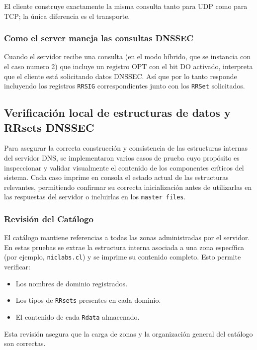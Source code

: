 El cliente construye exactamente la misma consulta tanto para UDP como para TCP; la única diferencia es el transporte.

\subsubsection{Como el server maneja las consultas DNSSEC}

Cuando el servidor recibe una consulta (en el modo híbrido, que se instancia con el caso numero 2) que incluye un registro OPT con el bit DO activado, interpreta que el cliente está solicitando datos DNSSEC.
Así que por lo tanto responde incluyendo los registros \texttt{RRSIG} correspondientes junto con los \texttt{RRSet} solicitados.


\subsection{Verificación local de estructuras de datos y RRsets DNSSEC}

Para asegurar la correcta construcción y consistencia de las estructuras internas del servidor DNS, se implementaron varios casos de prueba cuyo propósito es inspeccionar y validar visualmente el 
contenido de los componentes críticos del sistema. Cada caso imprime en consola el estado actual de las estructuras relevantes, permitiendo confirmar su correcta inicialización antes de utilizarlas en 
las respuestas del servidor o incluirlas en los \texttt{master files}.

\subsubsection{Revisión del Catálogo}

El catálogo mantiene referencias a todas las zonas administradas por el servidor.  
En estas pruebas se extrae la estructura interna asociada a una zona específica (por ejemplo, \texttt{niclabs.cl}) y se imprime su contenido completo. Esto permite verificar:

\begin{itemize}
    \item Los nombres de dominio registrados.
    \item Los tipos de \texttt{RRsets} presentes en cada dominio.
    \item El contenido de cada \texttt{Rdata} almacenado.
\end{itemize}

Esta revisión asegura que la carga de zonas y la organización general del catálogo son correctas.


